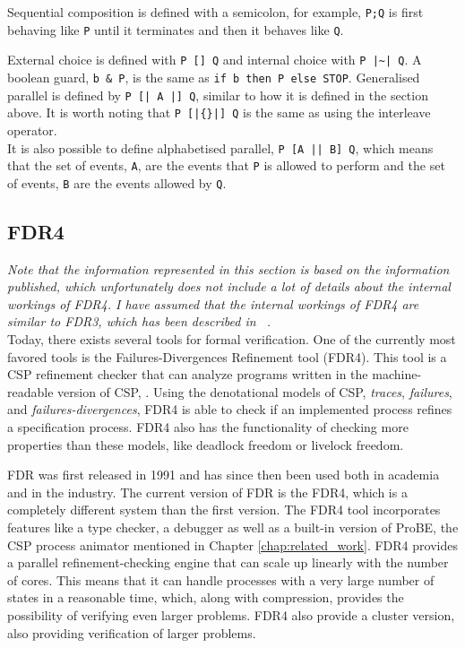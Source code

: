 Sequential composition is defined with a semicolon, for example, \texttt{P;Q} is first behaving like \texttt{P} until it terminates and then it behaves like \texttt{Q}.

External choice is defined with \texttt{P [] Q} and internal choice with \texttt{P |\textasciitilde| Q}. A boolean guard, \texttt{b \& P}, is the same as \texttt{if b then P else STOP}.
Generalised parallel is defined by \texttt{P [| A |] Q}, similar to how it is defined in the section above. It is worth noting that \texttt{P [|\{\}|] Q} is the same as using the interleave operator. \\
It is also possible to define alphabetised parallel, \texttt{P [A || B] Q}, which means that the set of events, \texttt{A}, are the events that \texttt{P} is allowed to perform and the set of events, \texttt{B} are the events allowed by \texttt{Q}.
%

\subsection{FDR4}
\label{sec:background_fdr}
\textit{Note that the information represented in this section is based on the information published, which unfortunately does not include a lot of details about the internal workings of FDR4. I have assumed that the internal workings of FDR4 are similar to FDR3, which has been described in ~\cite{fdr}.}\\

Today, there exists several tools for formal verification. One of the currently most favored tools is the Failures-Divergences Refinement tool (FDR4). This tool is a CSP refinement checker that can analyze programs written in the machine-readable version of CSP, \cspm{}. Using the denotational models of CSP, \textit{traces}, \textit{failures}, and \textit{failures-divergences}, FDR4 is able to check if an implemented process refines a specification process. FDR4 also has the functionality of checking more properties than these models, like deadlock freedom or livelock freedom.

FDR was first released in 1991 and has since then been used both in academia and in the industry. The current version of FDR is the FDR4, which is a completely different system than the first version.
The FDR4 tool incorporates features like a \cspm{} type checker, a debugger as well as a built-in version of ProBE, the CSP process animator mentioned in Chapter \ref{chap:related_work}. FDR4 provides a parallel refinement-checking engine that can scale up linearly with the number of cores. This means that it can handle processes with a very large number of states in a reasonable time, which, along with compression, provides the possibility of verifying even larger problems. FDR4 also provide a cluster version, also providing verification of larger problems.\\

